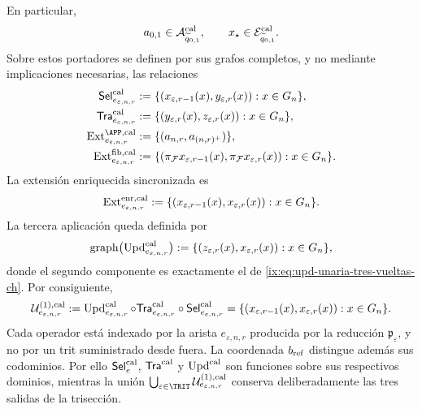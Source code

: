 En particular,
\[
 a_{0,1}\in\mathcal A^{\rm cal}_{\widetilde q_{0,1}},
 \qquad
 x_\star\in\mathcal E^{\rm cal}_{\widetilde q_{0,1}}.
\]
Sobre estos portadores se
definen por sus grafos completos, y no mediante implicaciones necesarias, las
relaciones
\begin{align}
 \mathsf{Sel}^{\rm cal}_{e_{\varepsilon,n,r}}
   &:=\{(x_{\varepsilon,r-1}(x),y_{\varepsilon,r}(x)):
          x\in G_n\},\\
 \mathsf{Tra}^{\rm cal}_{e_{\varepsilon,n,r}}
   &:=\{(y_{\varepsilon,r}(x),z_{\varepsilon,r}(x)):
          x\in G_n\},\\
 \operatorname{Ext}^{\APP,\rm cal}_{e_{\varepsilon,n,r}}
   &:=\{(a_{n,r},a_{(n,r)^+})\},
 \label{ix:eq:ext-app-calibrada-ch}\\
 \operatorname{Ext}^{\rm fib,cal}_{e_{\varepsilon,n,r}}
   &:=\{(\pi_{\mathcal F}x_{\varepsilon,r-1}(x),
          \pi_{\mathcal F}x_{\varepsilon,r}(x)):x\in G_n\}.
 \label{ix:eq:ext-fibra-calibrada-ch}
\end{align}
La extensión enriquecida sincronizada es
\begin{equation}
 \operatorname{Ext}^{\rm enr,cal}_{e_{\varepsilon,n,r}}
 :=\{(x_{\varepsilon,r-1}(x),x_{\varepsilon,r}(x)):
       x\in G_n\}.
 \label{ix:eq:ext-enriquecida-calibrada-ch}
\end{equation}
La tercera aplicación queda definida por
\begin{equation}
 \operatorname{graph}
 \bigl(\operatorname{Upd}^{\rm cal}_{e_{\varepsilon,n,r}}\bigr)
 :=\{(z_{\varepsilon,r}(x),x_{\varepsilon,r}(x)):
       x\in G_n\},
 \label{ix:eq:grafo-upd-calibrado-ch}
\end{equation}
donde el segundo componente es exactamente el de
\eqref{ix:eq:upd-unaria-tres-vueltas-ch}. Por consiguiente,
\begin{equation}
 \mathcal U^{(1),\rm cal}_{e_{\varepsilon,n,r}}
 :=\operatorname{Upd}^{\rm cal}_{e_{\varepsilon,n,r}}\circ
   \mathsf{Tra}^{\rm cal}_{e_{\varepsilon,n,r}}\circ
   \mathsf{Sel}^{\rm cal}_{e_{\varepsilon,n,r}}
 =\{(x_{\varepsilon,r-1}(x),x_{\varepsilon,r}(x)):
      x\in G_n\}.
 \label{ix:eq:transicion-cal-en-tpk-ch}
\end{equation}
Cada operador está indexado por la arista
\(e_{\varepsilon,n,r}\) producida por la reducción
\(\mathfrak p_\varepsilon\), y no por un trit suministrado desde fuera. La
coordenada \(b_{\rm ref}\) distingue además sus codominios. Por ello
\(\mathsf{Sel}^{\rm cal}_{e}\),
\(\mathsf{Tra}^{\rm cal}\) y \(\operatorname{Upd}^{\rm cal}\) son funciones
sobre sus respectivos dominios, mientras
la unión
\(\bigcup_{\varepsilon\in\TRIT}
\mathcal U^{(1),\rm cal}_{e_{\varepsilon,n,r}}\) conserva deliberadamente
las tres salidas de la trisección.

